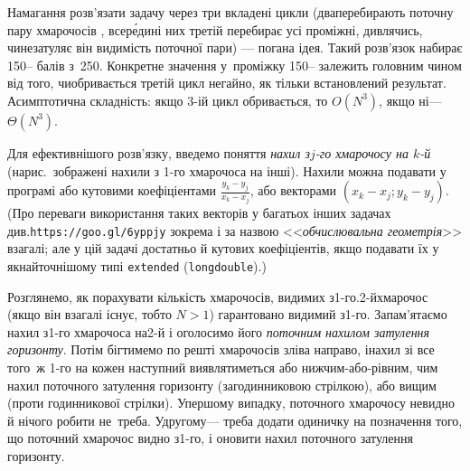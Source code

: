\Tutorial	Намагання розв'язати задачу через три вкладені цикли (два\nolinebreak[3] перебирають поточну пару хмарочосів , всер\'{е}дині них третій перебирає усі проміжні, дивлячись, чи\nolinebreak[2] не\nolinebreak[3] затуляє він видимість поточної пари) --- погана ідея. Такий розв’язок набирає 150-- балів з~250. Конкретне значення у~проміжку 150-- залежить головним чином від того, чи\nolinebreak[3] обривається третій цикл негайно, як тільки встановлений результат. Асимптотична складність: якщо \mbox{3-ій} цикл обривається, то $O(N^3)$, якщо ні\nolinebreak[3] --- $\Theta(N^3)$. 

Для ефективнішого розв'язку, введемо поняття \emph{нахил з\nolinebreak[3] \mbox{$j$-го} хмарочосу на \mbox{$k$-й}} (на\nolinebreak[2] рис.\ зображені нахили з \mbox{1-го} хмарочоса на інші). Нахили можна подавати у програмі або кутовими коефіціентами
$\displaystyle\frac{y_k-y_j}{x_k-x_j}$,
або векторами $({x_k{-}x_j}; {y_k{-}y_j})$.
(Про переваги використання таких векторів у багатьох інших задачах
див.\nolinebreak[1] \verb"https://goo.gl/6yppjy" зокрема і за назвою <<\emph{обчислювальна геометрія}>> взагалі; але у цій задачі достатньо й кутових коефіціентів, якщо подавати їх у якнайточнішому типі \verb"extended" (\texttt{long\nolinebreak[3] double}).)

Розглянемо, як порахувати кількість хмарочосів, видимих з\nolinebreak[3] \mbox{1-го}.\linebreak[2] \mbox{2-й}\nolinebreak[3] хмарочос (якщо він взагалі існує, тобто ${N{>}1}$) гарантовано видимий з\nolinebreak[3] \mbox{1-го}. Запам’ятаємо нахил з\nolinebreak[3] \mbox{1-го} хмарочоса на\nolinebreak[3] \mbox{2-й} і оголосимо його \emph{поточним нахилом затулення горизонту}. Потім бігтимемо по решті хмарочосів зліва направо, і\nolinebreak[3] нахил зі все того~ж \mbox{1-го} на кожен наступний виявлятиметься або нижчим-або-рівним, чим нахил поточного затулення горизонту (за\nolinebreak[3] годинниковою стрілкою), або вищим (проти годинникової стрілки). У\nolinebreak[3] першому випадку, поточного хмарочосу не\nolinebreak[3] видно й нічого робити не~треба. У\nolinebreak[3] другому\nolinebreak[3] --- треба додати одиничку на позначення того, що поточний хмарочос видно з\nolinebreak[3] \mbox{1-го}, і оновити нахил поточного затулення горизонту.

